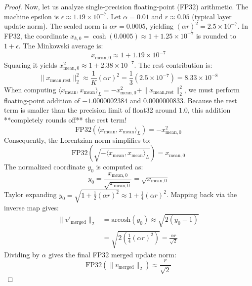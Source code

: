 \documentclass{article}
\theoremstyle{plain}
\theoremstyle{definition}
\theoremstyle{remark}
\begin{document}
\begin{proof}
Now, let us analyze single-precision floating-point (FP32) arithmetic. The machine epsilon is $\epsilon \approx 1.19 \times 10^{-7}$. Let $\alpha = 0.01$ and $r \approx 0.05$ (typical layer update norm). The scaled norm is $\alpha r = 0.0005$, yielding $(\alpha r)^2 = 2.5 \times 10^{-7}$.
In FP32, the coordinate $x_{k, 0} = \cosh(0.0005) \approx 1 + 1.25 \times 10^{-7}$ is rounded to $1 + \epsilon$. The Minkowski average is:
\begin{equation}
x_{\text{mean}, 0} \approx 1 + 1.19 \times 10^{-7}
\end{equation}
Squaring it yields $x_{\text{mean}, 0}^2 \approx 1 + 2.38 \times 10^{-7}$.
The rest contribution is:
\begin{equation}
\|x_{\text{mean}, \text{rest}}\|_2^2 \approx \frac{1}{K} (\alpha r)^2 = \frac{1}{3} (2.5 \times 10^{-7}) = 8.33 \times 10^{-8}
\end{equation}
When computing $\langle x_{\text{mean}}, x_{\text{mean}} \rangle_L = -x_{\text{mean}, 0}^2 + \|x_{\text{mean}, \text{rest}}\|_2^2$, we must perform floating-point addition of $-1.0000002384$ and $0.0000000833$. Because the rest term is smaller than the precision limit of float32 around $1.0$, this addition **completely rounds off** the rest term!
\begin{equation}
\text{FP32}(\langle x_{\text{mean}}, x_{\text{mean}} \rangle_L) = -x_{\text{mean}, 0}^2
\end{equation}
Consequently, the Lorentzian norm simplifies to:
\begin{equation}
\text{FP32}(\sqrt{-\langle x_{\text{mean}}, x_{\text{mean}} \rangle_L}) = x_{\text{mean}, 0}
\end{equation}
The normalized coordinate $y_0$ is computed as:
\begin{equation}
y_0 = \frac{x_{\text{mean}, 0}}{\sqrt{x_{\text{mean}, 0}}} = \sqrt{x_{\text{mean}, 0}}
\end{equation}
Taylor expanding $y_0 = \sqrt{1 + \frac{1}{2}(\alpha r)^2} \approx 1 + \frac{1}{4}(\alpha r)^2$.
Mapping back via the inverse map gives:
\begin{align}
\|v'_{\text{merged}}\|_2 &= \text{arcosh}(y_0) \approx \sqrt{2(y_0 - 1)} \nonumber \\
&= \sqrt{2 \left(\frac{1}{4}(\alpha r)^2\right)} = \frac{\alpha r}{\sqrt{2}}
\end{align}
Dividing by $\alpha$ gives the final FP32 merged update norm:
\begin{equation}
\text{FP32}(\|v_{\text{merged}}\|_2) \approx \frac{r}{\sqrt{2}}
\end{equation}
\end{proof}
\end{document}
